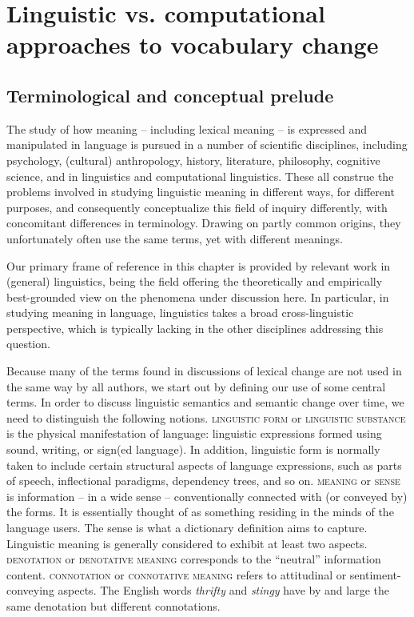 \documentclass[output=paper]{langsci/langscibook}
\begin{document}
\section{Linguistic vs. computational approaches to vocabulary change}\label{sec:lingappr}
\subsection{Terminological and conceptual prelude}\label{sec:lingterms}
The study of how meaning -- including lexical meaning -- is
expressed and manipulated in language is pursued in a number of
scientific disciplines, including psychology, (cultural) anthropology,
history, literature, philosophy, cognitive science, and in linguistics
and computational linguistics. These all construe the problems
involved in studying linguistic meaning in different ways, for
different purposes, and consequently conceptualize this field of
inquiry differently, with concomitant differences in
terminology. Drawing on partly common origins, they unfortunately
often use the same terms, yet with different meanings.

Our primary frame of reference in this chapter is provided
by relevant work in (general) linguistics, being the field offering
the theoretically and empirically best-grounded view on the phenomena
under discussion here. In particular, in studying meaning in language,
linguistics takes a broad cross-linguistic perspective, which is typically
lacking in the other disciplines addressing this question.

Because many of the terms found in discussions of lexical change are not used in the same way by all authors, we start out by defining our use of some central terms. In order to discuss linguistic
semantics and semantic change over time, we need to distinguish the following notions. \textsc{linguistic form} or
\textsc{linguistic substance} is the physical manifestation of language:
linguistic expressions formed using sound, writing, or sign(ed
language). In addition, linguistic form is normally taken to include certain
structural aspects of language expressions, such as parts of speech,
inflectional paradigms, dependency trees, and so on. \textsc{meaning} or
\textsc{sense} is information -- in a wide sense -- conventionally connected with (or conveyed
by) the forms. It is essentially thought of as something residing in
the minds of the language users. The sense is what a dictionary
definition aims to capture. Linguistic meaning is generally considered
to exhibit at least two aspects. \textsc{denotation} or \textsc{denotative
  meaning} corresponds to the ``neutral'' information content. 
\textsc{connotation} or \textsc{connotative meaning} refers to attitudinal
or sentiment-conveying aspects. The English words \emph{thrifty} and
\emph{stingy} have by and large the same denotation but different
connotations.
\end{document}
